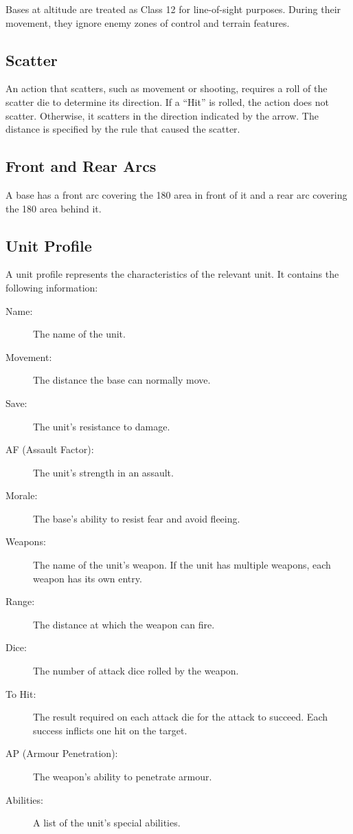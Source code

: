 Bases at altitude are treated as Class 12 for line-of-sight purposes. During their movement, they ignore enemy zones of control and terrain features.

\subsection{Scatter}

An action that scatters, such as movement or shooting, requires a roll of the scatter die to determine its direction. If a ``Hit'' is rolled, the action does not scatter. Otherwise, it scatters in the direction indicated by the arrow. The distance is specified by the rule that caused the scatter.

\subsection{Front and Rear Arcs}

A base has a front arc covering the 180\textdegree{} area in front of it and a rear arc covering the 180\textdegree{} area behind it.

\subsection{Unit Profile}

A unit profile represents the characteristics of the relevant unit. It contains the following information:

\begin{description}
    \item[Name:] The name of the unit.

    \item[Movement:] The distance the base can normally move.

    \item[Save:] The unit's resistance to damage.

    \item[AF (Assault Factor):] The unit's strength in an assault.

    \item[Morale:] The base's ability to resist fear and avoid fleeing.

    \item[Weapons:] The name of the unit's weapon. If the unit has multiple weapons, each weapon has its own entry.

    \item[Range:] The distance at which the weapon can fire.

    \item[Dice:] The number of attack dice rolled by the weapon.

    \item[To Hit:] The result required on each attack die for the attack to succeed. Each success inflicts one hit on the target.

    \item[AP (Armour Penetration):] The weapon's ability to penetrate armour.

    \item[Abilities:] A list of the unit's special abilities.
\end{description}

